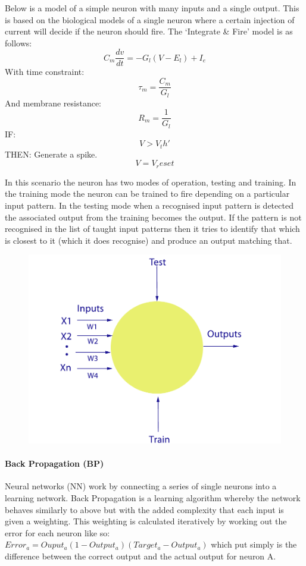 Below is a model of a simple neuron with many inputs and a single output. This is based on the biological models of a single neuron where a certain injection of current will decide if the neuron should fire. The `Integrate \& Fire' model is as follows:
$$C_m\frac{dv}{dt}=-G_l(V-E_l)+I_e$$
With time constraint: $$\tau_m = \frac{C_m}{G_l}$$
And membrane resistance: $$R_m = \frac{1}{G_l}$$
IF: $$V > V_th'$$ THEN: Generate a spike. $$V=V_reset$$

In this scenario the neuron has two modes of operation, testing and training. In the training mode the neuron can be trained to fire depending on a particular input pattern. In the testing mode when a recognised input pattern is detected the associated output from the training becomes the output. If the pattern is not recognised in the list of taught input patterns then it tries to identify that which is closest to it (which it does recognise) and produce an output matching that.
\begin{figure}[h]
    \centering
    \includegraphics[height=0.25\textheight]{fig02/nnsimple.pdf}
    \label{fig:kinect}
\end{figure}


\paragraph{Back Propagation (BP)}
Neural networks (NN) work by connecting a series of single neurons into a learning network. Back Propagation is a learning algorithm whereby the network behaves similarly to above but with the added complexity that each input is given a weighting. This weighting is calculated iteratively by working out the error for each neuron like so: $Error_a = Ouput_a(1-Output_a)(Target_a - Output_a)$ which put simply is the difference between the correct output and the actual output for neuron A.

